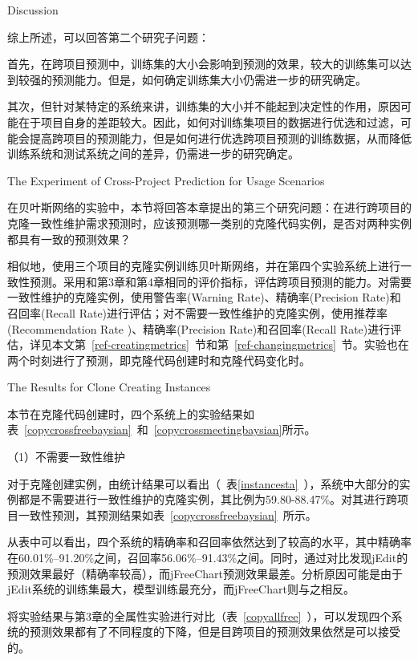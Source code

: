 {Discussion}

综上所述，可以回答第二个研究子问题：

首先，在跨项目预测中，训练集的大小会影响到预测的效果，较大的训练集可以达到较强的预测能力。但是，如何确定训练集大小仍需进一步的研究确定。

其次，但针对某特定的系统来讲，训练集的大小并不能起到决定性的作用，原因可能在于项目自身的差距较大。因此，如何对训练集项目的数据进行优选和过滤，可能会提高跨项目的预测能力，但是如何进行优选跨项目预测的训练数据，从而降低训练系统和测试系统之间的差异，仍需进一步的研究确定。

{The Experiment of Cross-Project Prediction for Usage Scenarios}

在贝叶斯网络的实验中，本节将回答本章提出的第三个研究问题：在进行跨项目的克隆一致性维护需求预测时，应该预测哪一类别的克隆代码实例，是否对两种实例都具有一致的预测效果？

相似地，使用三个项目的克隆实例训练贝叶斯网络，并在第四个实验系统上进行一致性预测。采用和第3章和第4章相同的评价指标，评估跨项目预测的能力。对需要一致性维护的克隆实例，使用警告率(Warning Rate)、精确率(Precision Rate)和召回率(Recall Rate)进行评估；对不需要一致性维护的克隆实例，使用推荐率(Recommendation Rate )、精确率(Precision Rate)和召回率(Recall Rate)进行评估，详见本文第~\ref{ref-creatingmetrics}~节和第~\ref{ref-changingmetrics}~节。实验也在两个时刻进行了预测，即克隆代码创建时和克隆代码变化时。

{The Results for Clone Creating Instances}

本节在克隆代码创建时，四个系统上的实验结果如表~\ref{copycrossfreebaysian}~和~\ref{copycrossmeetingbaysian}所示。

（1）不需要一致性维护

对于克隆创建实例，由统计结果可以看出（~表\ref{instancesta}~），系统中大部分的实例都是不需要进行一致性维护的克隆实例，其比例为59.80-88.47\%。对其进行跨项目一致性预测，其预测结果如表~\ref{copycrossfreebaysian}~所示。

从表中可以看出，四个系统的精确率和召回率依然达到了较高的水平，其中精确率在60.01\%--91.20\%之间，召回率56.06\%--91.43\%之间。同时，通过对比发现jEdit的预测效果最好（精确率较高），而jFreeChart预测效果最差。分析原因可能是由于jEdit系统的训练集最大，模型训练最充分，而jFreeChart则与之相反。

将实验结果与第3章的全属性实验进行对比（表~\ref{copyallfree}~），可以发现四个系统的预测效果都有了不同程度的下降，但是目跨项目的预测效果依然是可以接受的。

